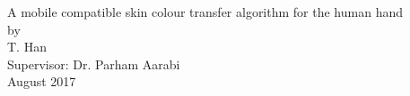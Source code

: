 \documentclass[12pt,a4paper]{report}
\begin{document}
\begin{titlepage}
	\centering
	\vspace{1.5cm}
	\huge A mobile compatible skin colour transfer algorithm for the human hand\\
	\vspace{3cm}
	\large by\\
	\vspace{1cm}
	\large T. Han\\
	\vspace{1cm}
	\large Supervisor: Dr. Parham Aarabi\\
	\large August 2017\\
	\vfill
	
\end{titlepage}
\end{document}
